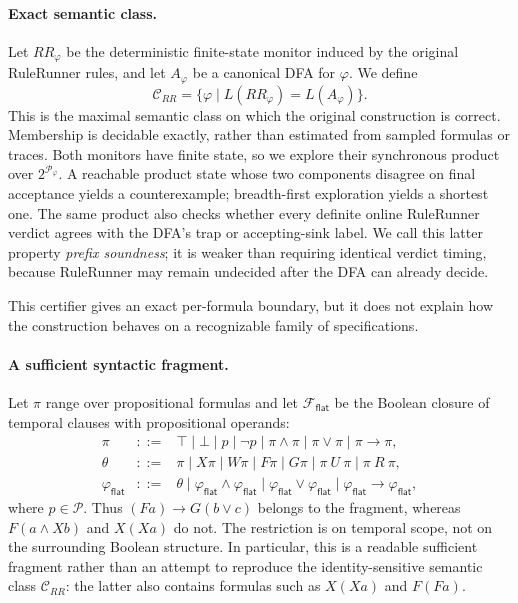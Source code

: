 \paragraph{Exact semantic class.}
Let $RR_\varphi$ be the deterministic finite-state monitor induced by the
original RuleRunner rules, and let $A_\varphi$ be a canonical DFA for
$\varphi$.  We define
\[
    \mathcal C_{RR}
    = \{\varphi \mid L(RR_\varphi)=L(A_\varphi)\}.
\]
This is the maximal semantic class on which the original construction is
correct.  Membership is decidable exactly, rather than estimated from sampled
formulas or traces.  Both monitors have finite state, so we explore their
synchronous product over $2^{\mathcal P_\varphi}$.  A reachable product state
whose two components disagree on final acceptance yields a counterexample;
breadth-first exploration yields a shortest one.  The same product also checks
whether every definite online RuleRunner verdict agrees with the DFA's trap or
accepting-sink label.  We call this latter property \emph{prefix soundness}; it
is weaker than requiring identical verdict timing, because RuleRunner may
remain undecided after the DFA can already decide.

This certifier gives an exact per-formula boundary, but it does not explain how
the construction behaves on a recognizable family of specifications.

\paragraph{A sufficient syntactic fragment.}
Let $\pi$ range over propositional formulas and let
$\mathcal F_{\mathsf{flat}}$ be the Boolean closure of temporal clauses with
propositional operands:
\[
\begin{array}{rcl}
\pi &::=& \top \mid \bot \mid p \mid \neg p
 \mid \pi\land\pi \mid \pi\lor\pi \mid \pi\to\pi,\\
\theta &::=& \pi \mid X\pi \mid W\pi \mid F\pi \mid G\pi
 \mid \pi\ U\ \pi \mid \pi\ R\ \pi,\\
\varphi_{\mathsf{flat}} &::=& \theta
 \mid \varphi_{\mathsf{flat}}\land\varphi_{\mathsf{flat}}
 \mid \varphi_{\mathsf{flat}}\lor\varphi_{\mathsf{flat}}
 \mid \varphi_{\mathsf{flat}}\to\varphi_{\mathsf{flat}},
\end{array}
\]
where $p\in\mathcal P$.  Thus $(Fa)\to G(b\lor c)$ belongs to the
fragment, whereas $F(a\land Xb)$ and $X(Xa)$ do not.  The restriction is on
temporal scope, not on the surrounding Boolean structure.  In particular,
this is a readable sufficient fragment rather than an attempt to reproduce
the identity-sensitive semantic class $\mathcal C_{RR}$: the latter also
contains formulas such as $X(Xa)$ and $F(Fa)$.

